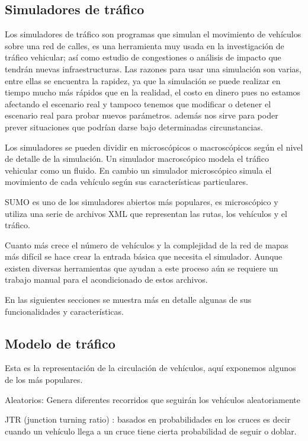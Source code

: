 \subsection{Simuladores de tráfico}
Los simuladores de tráfico son programas que simulan el movimiento de vehículos sobre una red de calles, es una herramienta muy usada en la investigación de tráfico vehicular; así como estudio de congestiones o análisis de impacto que tendrán nuevas infraestructuras.  Las razones para usar una simulación son varias, entre ellas se encuentra  la rapidez, ya que la simulación se puede realizar en tiempo mucho más rápidos que en la realidad, el costo en dinero pues no estamos afectando el escenario real  y tampoco tenemos que modificar o detener el escenario real para probar nuevos parámetros. además nos sirve para poder prever situaciones que podrían darse bajo determinadas circunstancias.

Los simuladores se pueden dividir en microscópicos o macroscópicos según el nivel de detalle de la simulación. Un simulador macroscópico modela  el tráfico vehicular como un fluido. En cambio un simulador microscópico simula el movimiento de cada vehículo según sus características particulares.

SUMO\citep{SUMO} es uno de los simuladores abiertos más populares, es microscópico y utiliza una serie de archivos  XML que representan las rutas, los vehículos y el tráfico.  

Cuanto más crece el número de vehículos y la complejidad de la red de mapas más difícil se hace crear la entrada básica que necesita el simulador. Aunque existen diversas herramientas que ayudan a este proceso aún se requiere un trabajo manual para el acondicionado de estos archivos.

En las siguientes secciones se muestra más en detalle algunas de sus funcionalidades y características.


\subsection{Modelo de tráfico }
Esta es la representación de la circulación de vehículos, aquí exponemos algunos de los más populares. 

Aleatorios: Genera diferentes recorridos que seguirán los vehículos aleatoriamente

JTR (junction turning ratio) : basados en probabilidades en los cruces  es decir cuando un vehículo llega a un cruce tiene cierta probabilidad de seguir o doblar.
 

